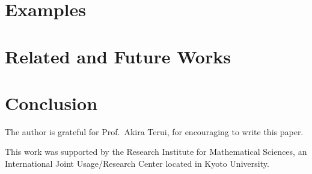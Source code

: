 \documentclass[%
  sigconf,authorversion,screen]{acmart}
\begin{document}
\section{Examples}

\section{Related and Future Works}

\section{Conclusion}

\begin{acks}
The author is grateful for Prof.\ Akira Terui, for encouraging  to write this paper.

This work was supported by the Research Institute for Mathematical Sciences,
an International Joint Usage/Research Center located in Kyoto University.
\end{acks}



\end{document}
